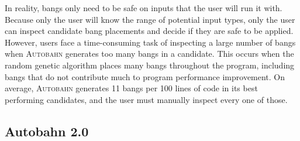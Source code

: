 \documentclass[format=sigplan, review=true]{acmart}
\begin{document}
In reality, bangs only need to be safe on inputs that the user will run it with. 
Because only the user will know the range of potential input types, only the user can inspect candidate bang placements and decide if they are safe to be applied. However, users face a time-consuming task of inspecting a large number of bangs when \textsc{Autobahn} generates too many bangs in a candidate. This occurs when the random genetic algorithm places many bangs throughout the program, including bangs that do not contribute much to program performance improvement. On average, \textsc{Autobahn} generates 11 bangs per 100 lines of code in its best performing candidates, and the user must manually inspect every one of those.   

\subsection{Autobahn 2.0}
\end{document}
